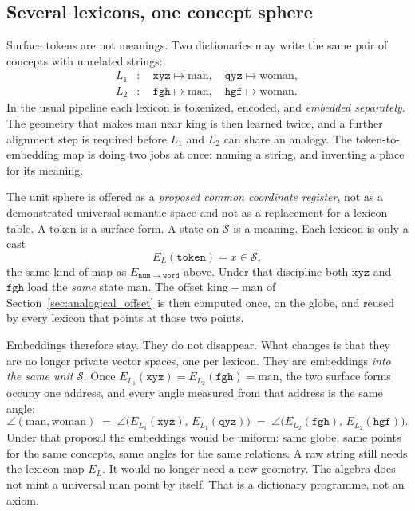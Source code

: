 \documentclass[12pt, a4paper]{article}
\begin{document}
\subsection{Several lexicons, one concept sphere}
\label{subsec:shared_lexicons}
Surface tokens are not meanings. Two dictionaries may write the same
pair of concepts with unrelated strings:
\begin{equation}
    \begin{aligned}
        L_1&: \quad \texttt{xyz}\mapsto\mathrm{man},\quad
                    \texttt{qyz}\mapsto\mathrm{woman},\\
        L_2&: \quad \texttt{fgh}\mapsto\mathrm{man},\quad
                    \texttt{hgf}\mapsto\mathrm{woman}.
    \end{aligned}
    \label{eq:two_lexicons}
\end{equation}
In the usual pipeline each lexicon is tokenized, encoded, and
\emph{embedded separately}. The geometry that makes
$\mathrm{man}$ near $\mathrm{king}$ is then learned twice, and a
further alignment step is required before $L_1$ and $L_2$ can share
an analogy. The token-to-embedding map is doing two jobs at once:
naming a string, and inventing a place for its meaning.

The unit sphere is offered as a \emph{proposed common coordinate register}, not as a demonstrated universal semantic space and not as a replacement for a lexicon table.
A token is a surface form. A state on $\mathcal{S}$ is a meaning.
Each lexicon is only a cast
\begin{equation}
    E_{L}(\texttt{token}) = x\in\mathcal{S},
    \label{eq:lexicon_cast}
\end{equation}
the same kind of map as $E_{\mathtt{num}\to\mathtt{word}}$ above.
Under that discipline both $\texttt{xyz}$ and $\texttt{fgh}$ load the
\emph{same} state $\mathrm{man}$. The offset
$\mathrm{king}-\mathrm{man}$ of Section~\ref{sec:analogical_offset}
is then computed once, on the globe, and reused by every lexicon that
points at those two points.

Embeddings therefore stay. They do not disappear.
What changes is that they are no longer private vector spaces, one
per lexicon. They are embeddings \emph{into the same unit}
$\mathcal{S}$. Once $E_{L_1}(\texttt{xyz})=E_{L_2}(\texttt{fgh})=\mathrm{man}$,
the two surface forms occupy one address, and every angle measured
from that address is the same angle:
\begin{equation}
    \angle(\mathrm{man},\mathrm{woman})
    \;=\;
    \angle\bigl(E_{L_1}(\texttt{xyz}),\,E_{L_1}(\texttt{qyz})\bigr)
    \;=\;
    \angle\bigl(E_{L_2}(\texttt{fgh}),\,E_{L_2}(\texttt{hgf})\bigr).
    \label{eq:uniform_angles}
\end{equation}
Under that proposal the embeddings would be uniform: same globe, same points for the same
concepts, same angles for the same relations. A raw string still
needs the lexicon map $E_L$. It would no longer need a new geometry.
The algebra does not mint a universal $\mathrm{man}$ point by itself. That is a dictionary programme, not an axiom.
\end{document}

